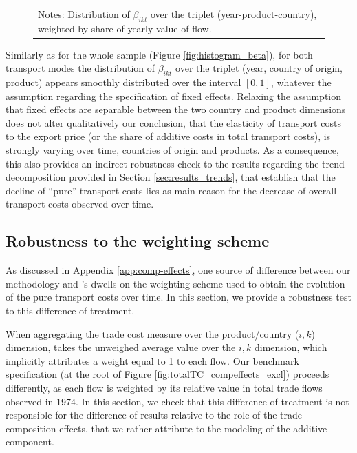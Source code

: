\documentclass[a4paper,11pt]{article}
\begin{document}
\begin{figure}[htbp]
\begin{center}
\begin{tabular}{cc}
\multicolumn{2}{l}{{\footnotesize Notes: Distribution of $\beta_{ikt}$ over the triplet (year-product-country), weighted by share of yearly value of flow.}}\\
\end{tabular}
\end{center}
\end{figure}

Similarly as for the whole sample (Figure \ref{fig:histogram_beta}), for both transport modes the distribution of $\beta_{ikt}$ over the triplet (year, country of origin, product) appears smoothly distributed over the interval $[0,1]$, whatever the assumption regarding the specification of fixed effects.
Relaxing the assumption that fixed effects are separable between the two country and product dimensions does not alter qualitatively our conclusion, that the elasticity of transport costs to the export price (or the share of additive costs in total transport costs), is strongly varying over time, countries of origin and products.
As a consequence, this also provides an indirect robustness check to the results regarding the trend decomposition provided in Section \ref{sec:results_trends}, that establish that the decline of ``pure'' transport costs lies as main reason for the decrease of overall transport costs observed over time.


\subsection{Robustness to the weighting scheme }

As discussed in Appendix \ref{app:comp-effects}, one source of difference between our methodology and \citet{hummels2007}'s dwells on the weighting scheme used to obtain the evolution of the pure transport costs over time.
In this section, we provide a robustness test to this difference of treatment.\smallskip

When aggregating the trade cost measure over the product/country ($i,k$) dimension, \cite{hummels2007} takes the unweighed average value over the $i,k$ dimension, which implicitly attributes a weight equal to 1 to each flow.
Our benchmark specification  (at the root of Figure \ref{fig:totalTC_compeffects_excl}) proceeds differently, as each flow is weighted by its relative value in total trade flows observed in 1974.
In this section, we check that this difference of treatment is not responsible for the difference of results relative to the role of the trade composition effects, that we rather attribute to the modeling of the additive component.
\end{document}
